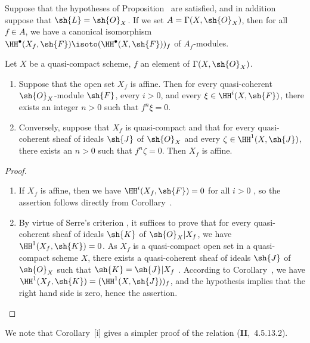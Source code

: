 \begin{corollary}[1.4.6]
\label{III.1.4.6}
Suppose that the hypotheses of Proposition~ are satisfied, and in addition suppose that $\sh{L}=\sh{O}_X$.
If we set $A=\Gamma(X,\sh{O}_X)$, then for all $f\in A$, we have a canonical isomorphism $\HH^\bullet(X_f,\sh{F})\isoto(\HH^\bullet(X,\sh{F}))_f$ of $A_f$-modules.
\end{corollary}

\begin{corollary}[1.4.7]
\label{III.1.4.7}
Let $X$ be a quasi-compact scheme, $f$ an element of $\Gamma(X,\sh{O}_X)$.
\begin{enumerate}
  \item[{\rm(i)}] Suppose that the open set $X_f$ is affine.
    Then for every quasi-coherent $\sh{O}_X$-module $\sh{F}$, every $i>0$, and every $\xi\in\HH^i(X,\sh{F})$, there exists an integer $n>0$ such that $f^n\xi=0$.
  \item[{\rm(ii)}] Conversely, suppose that $X_f$ is quasi-compact and that for every quasi-coherent sheaf of ideals $\sh{J}$ of $\sh{O}_X$ and every $\zeta\in\HH^1(X,\sh{J})$, there exists an $n>0$ such that $f^n\zeta=0$.
    Then $X_f$ is affine.
\end{enumerate}
\end{corollary}

\begin{proof}
\medskip\noindent
\begin{enumerate}
  \item[(i)] If $X_f$ is affine, then we have $\HH^i(X_f,\sh{F})=0$ for all $i>0$ , so the assertion follows directly from Corollary~.
  \item[(ii)] By virtue of Serre's criterion , it suffices to prove that for every quasi-coherent sheaf of ideals $\sh{K}$ of $\sh{O}_X|X_f$, we have $\HH^1(X_f,\sh{K})=0$.
    As $X_f$ is a quasi-compact open set in a quasi-compact scheme $X$, there exists a quasi-coherent sheaf of ideals $\sh{J}$ of $\sh{O}_X$ such that $\sh{K}=\sh{J}|X_f$ .
    According to Corollary~, we have $\HH^1(X_f,\sh{K})=(\HH^1(X,\sh{J}))_f$, and the hypothesis implies that the right hand side is zero, hence the assertion.
\end{enumerate}
\end{proof}

\begin{remark}[1.4.8]
\label{III.1.4.8}
We note that Corollary~[i] gives a simpler proof of the relation (\textbf{II},~4.5.13.2).
\end{remark}

